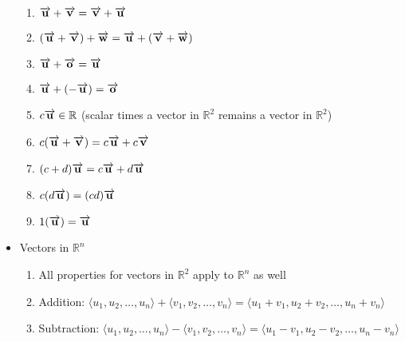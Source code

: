 \documentclass[12pt]{article}
\begin{document}
\begin{itemize}
\begin{enumerate}
      \item $\overrightarrow{\bold{u}} + \overrightarrow{\bold{v}} =\overrightarrow{\bold{v}} + \overrightarrow{\bold{u}}$

      \item $(\overrightarrow{\bold{u}} + \overrightarrow{\bold{v}}) + \overrightarrow{\bold{w}} =\overrightarrow{\bold{u}} + (\overrightarrow{\bold{v}} + \overrightarrow{\bold{w}}) $

      \item $\overrightarrow{\bold{u}}+\overrightarrow{\bold{o}}=\overrightarrow{\bold{u}}$

      \item $\overrightarrow{\bold{u}} + (-\overrightarrow{\bold{u}})=\overrightarrow{\bold{o}}$

      \item $c\overrightarrow{\bold{u}} \in \mathbb{R}$ (scalar times a vector in $\mathbb{R}^2$ remains a vector in $\mathbb{R}^2$)

      \item $c(\overrightarrow{\bold{u}} + \overrightarrow{\bold{v}})=c\overrightarrow{\bold{u}}+c\overrightarrow{\bold{v}}$

      \item $(c+d)\overrightarrow{\bold{u}}=c\overrightarrow{\bold{u}} + d\overrightarrow{\bold{u}}$

      \item $c(d\overrightarrow{\bold{u}})=(cd)\overrightarrow{\bold{u}}$

      \item $1(\overrightarrow{\bold{u}})=\overrightarrow{\bold{u}}$

    \end{enumerate}

  \item Vectors in $\mathbb{R}^n$

    \begin{enumerate}

      \item All properties for vectors in $\mathbb{R}^2$ apply to $\mathbb{R}^n$ as well

      \item Addition: $\langle u_1, u_2, \dots, u_n\rangle + \langle v_1, v_2, \dots, v_n \rangle = \langle u_1+v_1, u_2+v_2, \dots, u_n+v_n \rangle$

      \item Subtraction: $\langle u_1, u_2, \dots, u_n\rangle - \langle v_1, v_2, \dots, v_n \rangle = \langle u_1-v_1, u_2-v_2, \dots, u_n-v_n \rangle$


\end{enumerate}
\end{itemize}
\end{document}
